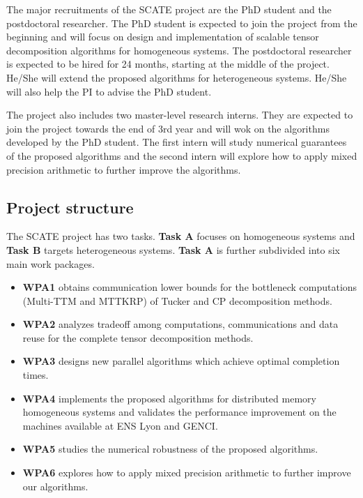 \documentclass[a4paper,11pt]{article}
\begin{document}
	The major recruitments of the SCATE project are the PhD student and the postdoctoral researcher. The PhD student is expected to join the project from the beginning and will focus on design and implementation of scalable tensor decomposition algorithms for homogeneous systems. The postdoctoral researcher is expected to be hired for 24 months, starting at the middle of the project. He/She will extend the proposed algorithms for heterogeneous systems. He/She will also help the PI to advise the PhD student.
	
	The project also includes two master-level research interns. They are expected to join the project towards the end of 3rd year and will wok on the algorithms developed by the PhD student. The first intern will study numerical guarantees of the proposed algorithms and the second intern will explore how to apply mixed precision arithmetic to further improve the algorithms.
			
	\vspace*{-0.15cm}\subsection{Project structure}
	\label{sec:org:projstructure}
	The SCATE project has two tasks. \textbf{Task A} focuses on homogeneous systems and \textbf{Task B} targets heterogeneous systems. \textbf{Task A} is further subdivided into six main work packages.
	\begin{itemize}
		\item \textbf{WPA1} obtains communication lower bounds for the bottleneck computations (Multi-TTM and MTTKRP) of Tucker and CP decomposition methods.
		\item \textbf{WPA2} analyzes tradeoff among computations, communications and data reuse for the complete tensor decomposition methods.
		\item \textbf{WPA3} designs new parallel algorithms which achieve optimal completion times.
		\item \textbf{WPA4} implements the proposed algorithms for distributed memory homogeneous systems and validates the performance improvement on the machines available at ENS Lyon and GENCI.
		\item \textbf{WPA5} studies the numerical robustness of the proposed algorithms.
		\item \textbf{WPA6} explores how to apply mixed precision arithmetic to further improve our algorithms.
	\end{itemize}
	
\end{document}
